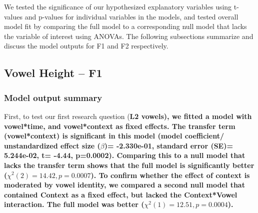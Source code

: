 \documentclass[12 pt]{article}
\begin{document}
We tested the significance of our hypothesized explanatory variables using t-values and p-values for individual variables in the models, and tested overall model fit by comparing the full model to a corresponding null model that lacks the variable of interest using ANOVAs. The following subsections summarize and discuss the model outputs for F1 and F2 respectively.



\subsection{Vowel Height -- F1}

\subsubsection*{Model output summary}

First, to test our first research question (\bf{L2 vowels}), we fitted a model with vowel*time, and vowel*context as fixed effects. The transfer term (vowel*context) is significant in this model (model coefficient/ unstandardized effect size ($\beta$)= -2.330e-01, standard error (SE)=  5.244e-02, t= -4.44, p=0.0002). Comparing this to a null model that lacks the transfer term shows that the full model is significantly better ($\chi^2(2) = 14.42, p=  0.0007$). To confirm whether the effect of context is moderated by vowel identity, we compared a second null model that contained Context as a fixed effect, but lacked the Context*Vowel interaction. The full model was better ($\chi^2(1) = 12.51, p= 0.0004$).
\end{document}
